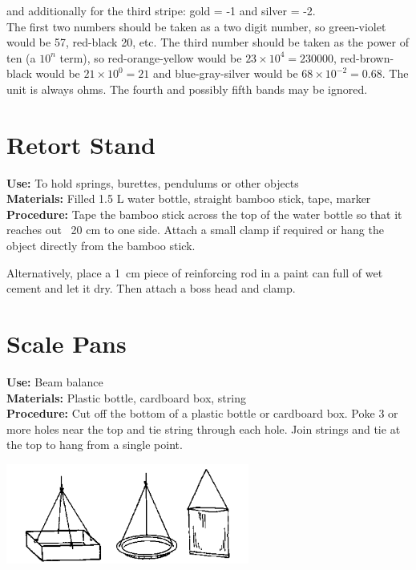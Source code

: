 \begin{multicols}{2}
\noindent and additionally for the third stripe: gold = -1 and silver = -2. \\

\noindent The first two numbers should be taken as a two digit number, so green-violet would be 57, red-black 20, etc. The third number should be taken as the power of ten (a $ 10^{n} $ term), so red-orange-yellow would be $ 23 \times 10^{4} = 230000 $, red-brown-black would be $ 21 \times 10^{0} = 21 $ and blue-gray-silver would be $ 68 \times 10^{-2} = 0.68 $. The unit is always ohms. The fourth and possibly fifth bands may be ignored.

\section{Retort Stand} 
\label{sec:retort-stand}
\vspace{-10pt}
\textbf{Use:} To hold springs, burettes, pendulums or other objects\\
\textbf{Materials:} Filled 1.5 L water bottle, straight bamboo stick, tape, marker\\
\textbf{Procedure:} Tape the bamboo stick across the top of the water bottle so that it reaches out ~20 cm to one side. Attach a small clamp if required or hang the object directly from the bamboo stick.

Alternatively, place a 1~cm piece of reinforcing rod in a paint can full of wet cement and let it dry. Then attach a boss head and clamp.

\section{Scale Pans} 
\label{sec:scale-pan}
\vspace{-10pt}
\textbf{Use:} Beam balance\\
\textbf{Materials:} Plastic bottle, cardboard box, string\\
\textbf{Procedure:} Cut off the bottom of a plastic bottle or cardboard box. Poke 3 or more holes near the top and tie string through each hole. Join strings and tie at the top to hang from a single point.
\begin{center}
\includegraphics[width=8cm]{./img/source/scale-pans.png}
\end{center}


\end{multicols}
